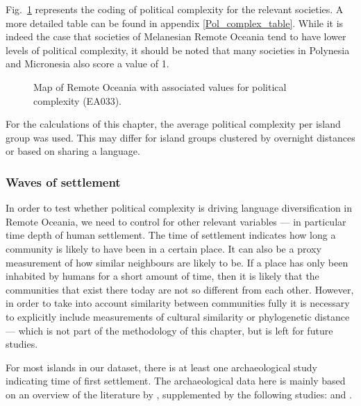 \documentclass[a4paper,10pt]{article} %
\begin{document}
Fig.~\ref{pol_complex_map} represents the coding of political complexity for the relevant societies. A more detailed table can be found in appendix \ref{Pol_complex_table}. While it is indeed the case that societies of Melanesian Remote Oceania tend to have lower levels of political complexity, it should be noted that many societies in Polynesia and Micronesia also score a value of 1.

\begin{figure}
\centering
\caption[Map of Remote Oceania: Political complexity]{{Map of Remote Oceania with associated values for political complexity (EA033).}}
\label{pol_complex_map}
\end{figure}

For the calculations of this chapter, the average political complexity per island group was used. This may differ for island groups clustered by overnight distances or based on sharing a language.


\subsubsection{Waves of settlement}
\label{pol_complex_sec_dates}
In order to test whether political complexity is driving language diversification in Remote Oceania, we need to control for other relevant variables --- in particular time depth of human settlement. The time of settlement indicates how long a community is likely to have been in a certain place. It can also be a proxy measurement of how similar neighbours are likely to be. If a place has only been inhabited by humans for a short amount of time, then it is likely that the communities that exist there today are not so different from each other. However, in order to take into account similarity between communities fully it is necessary to explicitly include measurements of cultural similarity or phylogenetic distance --- which is not part of the methodology of this chapter, but is left for future studies.

For most islands in our dataset, there is at least one archaeological study indicating time of first settlement. The archaeological data here is mainly based on an overview of the literature by \citet{rieth_cochrane_2018}, supplemented by the following studies: \citet{intoh2007reconnaissance, intoh2008ongoing, carson2012recent, kirch2012basline, Napolitano_et_al_yap, ellis2012saipan} and \citet{levin_seikel_miles_2019}. 
\end{document}
